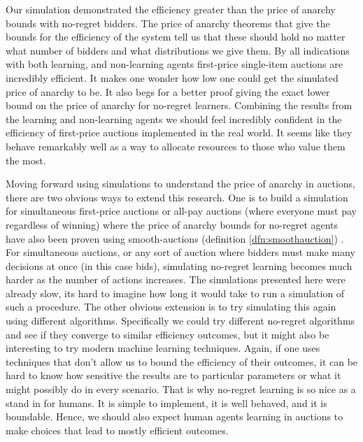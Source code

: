 \documentclass[12pt,twoside]{reedthesis}
\begin{document}
Our simulation demonstrated the efficiency greater than the price of anarchy bounds with no-regret bidders. The price of anarchy theorems that give the bounds for the efficiency of the system tell us that these should hold no matter what number of bidders and what distributions we give them. By all indications with both learning, and non-learning agents first-price single-item auctions are incredibly efficient. It makes one wonder how low one could get the simulated price of anarchy to be. It also begs for a better proof giving the exact lower bound on the price of anarchy for no-regret learners. Combining the results from the learning and non-learning agents we should feel incredibly confident in the efficiency of first-price auctions implemented in the real world. It seems like they behave remarkably well as a way to allocate resources to those who value them the most. 

Moving forward using simulations to understand the price of anarchy in auctions, there are two obvious ways to extend this research. One is to build a simulation for simultaneous first-price auctions or all-pay auctions (where everyone must pay regardless of winning) where the price of anarchy bounds for no-regret agents have also been proven using smooth-auctions (definition \ref{dfn:smoothauction}) \citep{Roughgarden2017}. For simultaneous auctions, or any sort of auction where bidders must make many decisions at once (in this case bids), simulating no-regret learning becomes much harder as the number of actions increases. The simulations presented here were already slow, its hard to imagine how long it would take to run a simulation of such a procedure. The other obvious extension is to try simulating this again using different algorithms. Specifically we could try different no-regret algorithms and see if they converge to similar efficiency outcomes, but it might also be interesting to try modern machine learning techniques. Again, if one uses techniques that don't allow us to bound the efficiency of their outcomes, it can be hard to know how sensitive the results are to particular parameters or what it might possibly do in every scenario. That is why no-regret learning is so nice as a stand in for humans. It is simple to implement, it is well behaved, and it is boundable. Hence, we should also expect human agents learning in auctions to make choices that lead to mostly efficient outcomes.


    \appendix
\end{document}
